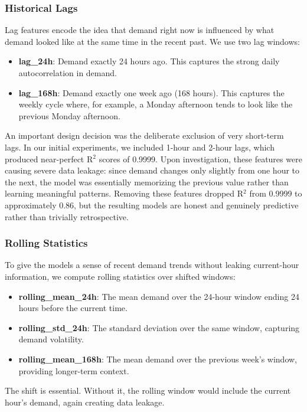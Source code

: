 \documentclass[conference]{IEEEtran}
\begin{document}
\subsubsection{Historical Lags}

Lag features encode the idea that demand right now is influenced by what demand looked like at the same time in the recent past. We use two lag windows:
\begin{itemize}
    \item \textbf{lag\_24h}: Demand exactly 24 hours ago. This captures the strong daily autocorrelation in demand.
    \item \textbf{lag\_168h}: Demand exactly one week ago (168 hours). This captures the weekly cycle where, for example, a Monday afternoon tends to look like the previous Monday afternoon.
\end{itemize}

An important design decision was the deliberate exclusion of very short-term lags. In our initial experiments, we included 1-hour and 2-hour lags, which produced near-perfect R$^{2}$ scores of 0.9999. Upon investigation, these features were causing severe data leakage: since demand changes only slightly from one hour to the next, the model was essentially memorizing the previous value rather than learning meaningful patterns. Removing these features dropped R$^{2}$ from 0.9999 to approximately 0.86, but the resulting models are honest and genuinely predictive rather than trivially retrospective.

\subsubsection{Rolling Statistics}

To give the models a sense of recent demand trends without leaking current-hour information, we compute rolling statistics over shifted windows:
\begin{itemize}
    \item \textbf{rolling\_mean\_24h}: The mean demand over the 24-hour window ending 24 hours before the current time.
    \item \textbf{rolling\_std\_24h}: The standard deviation over the same window, capturing demand volatility.
    \item \textbf{rolling\_mean\_168h}: The mean demand over the previous week's window, providing longer-term context.
\end{itemize}

The shift is essential. Without it, the rolling window would include the current hour's demand, again creating data leakage.
\end{document}
